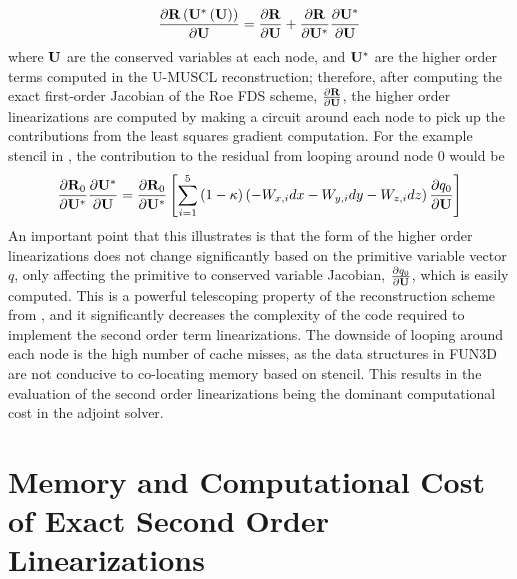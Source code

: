 \begin{equation}
  \frac{\partial \mathbf R\left(\mathbf U^*\left( \mathbf U \right) \right)}{\partial \mathbf U} = 
  \frac{\partial \mathbf R}{\partial \mathbf U} + \frac{\partial \mathbf R}{\partial \mathbf U^{*}}\frac{\partial \mathbf U^*}{\partial \mathbf U}
  \label{residual-high-low}
\end{equation}
where $\mathbf U$ are the conserved variables at each node, and $\mathbf U^*$ are the higher
order terms computed in the U-MUSCL reconstruction; therefore, after computing
the exact first-order Jacobian of the Roe FDS scheme, $\frac{\partial \mathbf R}{\partial \mathbf U}$, the
higher order linearizations are computed by making a circuit around each node to
pick up the contributions from the least squares gradient computation.  For the
example stencil in , the contribution to the residual
from looping around node 0 would be
\begin{equation}
  \frac{\partial \mathbf R_0}{\partial \mathbf U^*}\frac{\partial \mathbf U^*}{\partial \mathbf U} = \frac{\partial \mathbf R_0}{\partial \mathbf U^*} \left[\sum_{i=1}^5{(1-\kappa)
  \left( -W_{x,i}dx - W_{y,i}dy - W_{z,i}dz \right) \frac{\partial q_0}{\partial \mathbf U}}\right]
  \label{ho-linearization}
\end{equation}
An important point that this illustrates is that the form of the higher order
linearizations does not change significantly based on the primitive variable
vector $q$, only affecting the primitive to conserved variable Jacobian,
$\frac{\partial q_0}{\partial \mathbf U}$, which is easily computed.  This is a powerful telescoping
property of the reconstruction scheme from ,
and it significantly decreases the complexity of the code required to implement
the second order term linearizations.  The downside of looping around each node
is the high number of cache misses, as the data structures in FUN3D are not
conducive to co-locating memory based on stencil.  This results in the
evaluation of the second order linearizations being the dominant computational
cost in the adjoint solver.

\section{Memory and Computational Cost of Exact Second Order Linearizations}
\label{sec:2nd-order-mem-cost}

